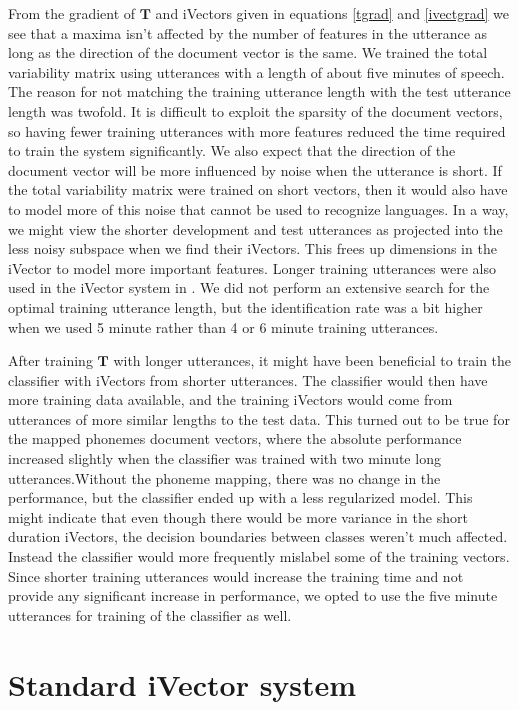 From the gradient of $\mathbf{T}$ and iVectors given in equations \ref{tgrad} and \ref{ivectgrad} we see that a maxima isn't affected by the number of features in the utterance as long as the direction of the document vector is the same. We trained the total variability matrix using utterances with a length of about five minutes of speech. The reason for not matching the training utterance length with the test utterance length was twofold. It is difficult to exploit the sparsity of the document vectors, so having fewer training utterances with more features reduced the time required to train the system significantly. We also expect that the direction of the document vector will be more influenced by noise when the utterance is short. If the total variability matrix were trained on short vectors, then it would also have to model more of this noise that cannot be used to recognize languages. In a way, we might view the shorter development and test utterances as projected into the less noisy subspace when we find their iVectors. This frees up dimensions in the iVector to model more important features. Longer training utterances were also used in the iVector system in \cite{lrivector}. We did not perform an extensive search for the optimal training utterance length, but the identification rate was a bit higher when we used 5 minute rather than 4 or 6 minute training utterances.

After training $\mathbf{T}$ with longer utterances, it might have been beneficial to train the classifier with iVectors from shorter utterances. The classifier would then have more training data available, and the training iVectors would come from utterances of more similar lengths to the test data. This turned out to be true for the mapped phonemes document vectors, where the absolute performance increased slightly when the classifier was trained with two minute long utterances.Without the phoneme mapping, there was no change in the performance, but the classifier ended up with a less regularized model. This might indicate that even though there would be more variance in the short duration iVectors, the decision boundaries between classes weren't much affected. Instead the classifier would more frequently mislabel some of the training vectors. Since shorter training utterances would increase the training time and not provide any significant increase in performance, we opted to use the five minute utterances for training of the classifier as well.


\section{Standard iVector system}
\label{sect:vanillaivect}

